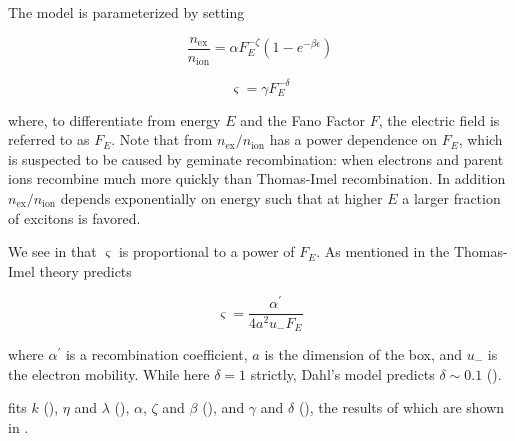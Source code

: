 The model is parameterized by setting

\begin{equation}
\frac{n_{\mathrm{ex}}}{n_{\mathrm{ion}}} = \alpha F_{E}^{-\zeta} ( 1 - e^{-\beta \epsilon})
\label{eq:er_nr_calibrations_parameter_determ_nr_nex_nion}
\end{equation}

\begin{equation}
\varsigma = \gamma F_{E}^{- \delta}
\label{eq:er_nr_calibrations_parameter_determ_nr_recomb_sigma}
\end{equation}

\noindent where, to differentiate from energy $E$ and the Fano Factor $F$, the electric field is referred to as $F_E$.  Note that
from  $n_{\mathrm{ex}} / n_{\mathrm{ion}}$ has a power dependence on $F_E$,
which is suspected to be caused by geminate recombination: when electrons and parent ions recombine much more quickly than Thomas-Imel
recombination.  In addition $n_{\mathrm{ex}} / n_{\mathrm{ion}}$ depends exponentially on energy such that at higher $E$ a larger fraction
of excitons is favored.

We see in  that $\varsigma$ is proportional to a power of $F_E$.  As
mentioned in  the Thomas-Imel theory predicts

\begin{equation}
\varsigma = \frac{\alpha^{\prime}}{4 a^2 u_- F_E}
\end{equation}

\noindent where $\alpha ^{\prime}$ is a recombination coefficient, $a$ is the dimension of the box, and $u_-$ is the electron mobility.  While
here $\delta = 1$ strictly, Dahl's model predicts $\delta \sim 0.1$ ().

 fits $k$ (), $\eta$ and $\lambda$
(), $\alpha$, $\zeta$ and $\beta$
(), and $\gamma$ and $\delta$
(), the results of which are shown in
.

